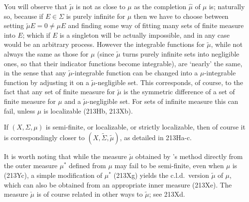 {You will observe that $\tilde\mu$ is not as close to $\mu$ as the
completion $\hat\mu$ of $\mu$
is;  naturally so, because if $E\in\Sigma$ is purely infinite for
$\mu$ then we have to choose between
setting $\tilde\mu E=0\ne\mu E$ and finding some way of fitting many
sets of finite measure into $E$;  which if $E$ is a singleton will be
actually impossible, and in any case would be an arbitrary process.
However the integrable functions for $\tilde\mu$, while not always the
same as those for $\mu$ (since $\tilde\mu$ turns purely infinite sets
into negligible ones, so that their indicator functions become
integrable), are `nearly' the same, in the sense that any
$\tilde\mu$-integrable function can be changed into a $\mu$-integrable
function by adjusting it on a $\tilde\mu$-negligible set.   This
corresponds, of course, to the fact that any set of finite measure for
$\tilde\mu$ is the symmetric difference of a set of finite measure for
$\mu$ and a $\tilde\mu$-negligible set.   For sets of infinite measure
this can fail, unless $\mu$ is localizable (213Hb, 213Xb).

If $(X,\Sigma,\mu)$ is semi-finite, or localizable, or strictly
localizable, then of course it is correspondingly closer to
$(X,\tilde\Sigma,\tilde\mu)$, as detailed in 213Ha-c.

It is worth noting that while the measure $\check\mu$ obtained by
\Caratheodory's method directly from the outer measure $\mu^*$ defined
from $\mu$ may fail to be semi-finite, even when $\mu$ is (213Yc), a
simple modification of $\mu^*$ (213Xg) yields the c.l.d.\ version
$\tilde\mu$ of $\mu$, which can also be obtained from an appropriate
inner measure (213Xe).   The measure $\check\mu$ is of course related
in other ways to $\tilde\mu$;  see 213Xd.
}%

\discrpage


